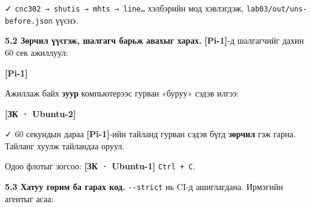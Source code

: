 ✓ \texttt{cnc302\ →\ shutis\ →\ mhts\ →\ line\ldots{}} хэлбэрийн мод хэвлэгдэж, \texttt{lab03/\allowbreak{}out/\allowbreak{}uns-before.\allowbreak{}json} үүснэ.

\textbf{5.2 Зөрчил үүсгэж, шалгагч барьж авахыг харах.} \textbf{{[}Pi-1{]}}-д шалгагчийг дахин 60 сек ажиллуул:

\textbf{{[}Pi-1{]}}

\begin{Shaded}
\begin{Highlighting}[]
 \StringTok{\textquotesingle{}\#\textquotesingle{}} \KeywordTok{|} 
\end{Highlighting}
\end{Shaded}

Ажиллаж байх \textbf{зуур} компьютерээс гурван «буруу» сэдэв илгээ:

\textbf{{[}ЗК · Ubuntu-2{]}}

\begin{Shaded}
\begin{Highlighting}[]
\OperatorTok{\textless{}}\OperatorTok{\textgreater{}}
\OperatorTok{\textless{}}\OperatorTok{\textgreater{}}\StringTok{\textquotesingle{}24\textquotesingle{}}
\OperatorTok{\textless{}}\OperatorTok{\textgreater{}}\StringTok{\textquotesingle{}\{\}\textquotesingle{}}
\end{Highlighting}
\end{Shaded}

✓ 60 секундын дараа \textbf{{[}Pi-1{]}}-ийн тайланд гурван сэдэв бүгд \textbf{зөрчил} гэж гарна. Тайланг хуулж тайландаа оруул.

Одоо флотыг зогсоо: \textbf{{[}ЗК · Ubuntu-1{]}} \texttt{Ctrl\ +\ C}.

\textbf{5.3 Хатуу горим ба гарах код.} \texttt{-\/-strict} нь CI-д ашиглагдана. Ирмэгийн агентыг асаа:

